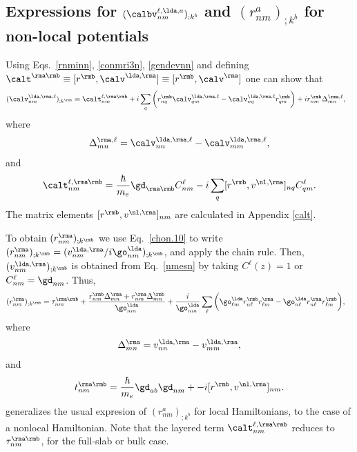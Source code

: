 \subsection{Expressions for 
\texorpdfstring{$(\calbv^{\ell,\lda,a}_{nm})_{;k^b}$}{Vnonlocal}
and \texorpdfstring{$(r^a_{nm})_{;k^b}$}{Vnonlocal}
for non-local potentials}\label{appvnl}
Using Eqs.~\eqref{rnminn}, \eqref{conmri3n}, \eqref{gendevnn} and
defining 
$
\calt^{\rma\rmb}\equiv[r^{\rmb},\calv^{\lda,\rma}]
\equiv
[r^{\rmb},\calv^\rma]
$
one can show that
\begin{align}\label{nmesn}
(\calv^{\lda,\rma,\ell}_{nm})_{;k^{\rmb}}&=
\calt_{nm}^{\ell,\rma\rmb}
+i
\sum_{q}
\bigg(
r^{\rmb}_{nq}  
\calv^{\lda,\rma,\ell}_{q m}
-
\calv^{\lda,\rma,\ell}_{nq}   
r^{\rmb}_{q m}
\bigg)  
+i  
r^{\rmb}_{nm}
\Delta^{\rma,\ell}_{mn}
,
\end{align}  
where
\begin{eqnarray}\label{tdel}
\Delta^{\rma,\ell}_{mn}
=
\calv^{\lda,\rma,\ell}_{nn}  
-
\calv^{\lda,\rma,\ell}_{mm}  
,
\end{eqnarray} 
and
\begin{align}\label{tau.1}
\calt_{nm}^{\ell,\rma\rmb}
=
\frac{\hbar}{m_e}\gd_{\rma\rmb}
C^\ell_{nm} 
-i 
\sum_q 
[r^{\rmb},v^{\nl,\rma}]_{nq}C^\ell_{qm} 
.
\end{align}  
The matrix elements $[r^{\rmb},v^{\nl,\rma}]_{nm}$
are calculated in Appendix \ref{calt}.

To obtain $(r^{\rma}_{nm})_{;k^{\rmb}}$ we use Eq.~\eqref{chon.10} to
write
$(r^{\rma}_{nm})_{;k^{\rmb}}
=(v^{\lda,\rma}_{nm}/i\go^\lda_{nm})_{;k^{\rmb}}
$, and apply the chain rule. 
Then, 
$(v^{\lda,\rma}_{nm})_{;k^{\rmb}}$ is obtained
from Eq.~\eqref{nmesn} by
taking
$C^\ell(z)=1$ or $C^\ell_{nm}=\gd_{nm}$. Thus,
\begin{align}\label{na_rgendevn}
(r^{\rma}_{nm})_{;k^{\rmb}}
&=
\tau^{\rma\rmb}_{nm}
+
\frac{ 
r^{\rmb}_{nm}
\Delta^{\rma}_{mn}
+r^{\rma}_{nm}
\Delta^{\rmb}_{mn}
}
{\go^\lda_{nm}}
+
\frac{i}{\go^\lda_{nm}}
\sum_{\ell}
\bigg(
\go^\lda_{\ell m} 
r^{\rmb}_{n\ell} 
r^{\rma}_{\ell m}
-
\go^\lda_{n\ell} 
r^{\rma}_{n\ell} 
r^{\rmb}_{\ell m}
\bigg)
,
\end{align} 
where 
\begin{eqnarray}\label{del}
\Delta^{\rma}_{mn}
=
v^{\lda,\rma}_{nn}  
-
v^{\lda,\rma}_{mm}  
,
\end{eqnarray}
and
\begin{align}\label{tau.1} 
t_{nm}^{\rma\rmb}
=\frac{\hbar}{m_e}\gd_{ab}\gd_{nm}+ 
-i [r^{\rmb},v^{\nl,\rma}]_{nm} 
.
\end{align}   
generalizes the usual expresion of
$(r^a_{nm})_{;k^b}$ for local 
Hamiltonians,\cite{aversaPRB95,nastosPRB05,cabellosPRB09,rashkeevPRB98}
to
the case of a
nonlocal Hamiltonian.
Note that the layered term
$\calt^{\ell,\rma\rmb}_{nm}$ reduces to $\tau^{\rma\rmb}_{nm}$, for the
full-slab or bulk case. 


